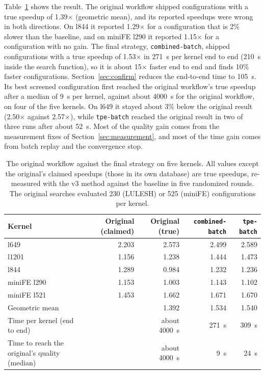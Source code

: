 \documentclass[10pt]{article}
\newcommand{\x}{\ensuremath{\times}}
\newcommand{\code}[1]{\texttt{#1}}
\begin{document}
Table~\ref{tab:endtoend} shows the result. The original workflow shipped
configurations with a true speedup of 1.39\x{} (geometric mean), and its
reported speedups were wrong in both directions. On l844 it reported
1.29\x{} for a configuration that is 2\% slower than the baseline, and on
miniFE l290 it reported 1.15\x{} for a configuration with no gain. The final
strategy, \code{combined-batch}, shipped configurations with a true speedup of
1.53\x{} in 271~s per kernel end to end (210~s inside the search function), so
it is about 15\x{} faster end to end and finds 10\% faster configurations.
Section~\ref{sec:confirm} reduces the end-to-end time to 105~s. Its best screened configuration first reached the
original workflow's true speedup after a median of 9~s per kernel, against
about 4000~s for the original workflow, on four of the five kernels. On l649
it stayed about 3\% below the original result (2.50\x{} against 2.57\x{}),
while \code{tpe-batch} reached the original result in two of three runs after
about 52~s. Most of the quality gain comes from the measurement fixes of
Section~\ref{sec:measurement}, and most of the time gain comes from batch
replay and the convergence stop.

\begin{table}[t]
\centering
\caption{The original workflow against the final strategy on five kernels.
All values except the original's claimed speedups (those in its own
database) are true speedups, re-measured with the v3 method against the
baseline in five randomized rounds. The original searches evaluated 230 (LULESH) or 525 (miniFE)
configurations per kernel.}
\label{tab:endtoend}
\small
\setlength{\tabcolsep}{4pt}
\begin{tabular}{>{\raggedright\arraybackslash}p{4.3cm}rrrr}
\toprule
Kernel & Original (claimed) & Original (true) & \code{combined-batch} & \code{tpe-batch} \\
\midrule
l649 & 2.203 & 2.573 & 2.499 & 2.589 \\
l1201 & 1.156 & 1.238 & 1.444 & 1.473 \\
l844 & 1.289 & 0.984 & 1.232 & 1.236 \\
miniFE l290 & 1.153 & 1.003 & 1.143 & 1.102 \\
miniFE l521 & 1.453 & 1.662 & 1.671 & 1.670 \\
\midrule
Geometric mean & & 1.392 & 1.534 & 1.540 \\
Time per kernel (end to end) & & about 4000~s & 271~s & 309~s \\
Time to reach the original's quality (median) & & about 4000~s & 9~s & 24~s \\
\bottomrule
\end{tabular}
\end{table}
\end{document}
